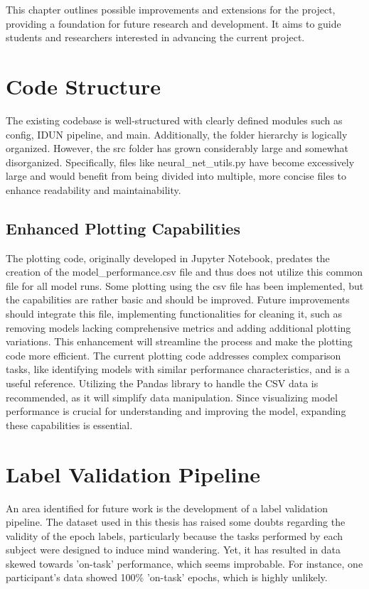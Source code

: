This chapter outlines possible improvements and extensions for the project, providing a foundation for future research and development. It aims to guide students and researchers interested in advancing the current project.

\section{Code Structure}
The existing codebase is well-structured with clearly defined modules such as config, IDUN pipeline, and main. Additionally, the folder hierarchy is logically organized. However, the src folder has grown considerably large and somewhat disorganized. Specifically, files like neural\_net\_utils.py have become excessively large and would benefit from being divided into multiple, more concise files to enhance readability and maintainability.

\subsection{Enhanced Plotting Capabilities}
The plotting code, originally developed in Jupyter Notebook, predates the creation of the model\_performance.csv file and thus does not utilize this common file for all model runs. Some plotting using the csv file has been implemented, but the capabilities are rather basic and should be improved. Future improvements should integrate this file, implementing functionalities for cleaning it, such as removing models lacking comprehensive metrics and adding additional plotting variations. This enhancement will streamline the process and make the plotting code more efficient. The current plotting code addresses complex comparison tasks, like identifying models with similar performance characteristics, and is a useful reference. Utilizing the Pandas library to handle the CSV data is recommended, as it will simplify data manipulation. Since visualizing model performance is crucial for understanding and improving the model, expanding these capabilities is essential.

\section{Label Validation Pipeline}
An area identified for future work is the development of a label validation pipeline. The dataset used in this thesis has raised some doubts regarding the validity of the epoch labels, particularly because the tasks performed by each subject were designed to induce mind wandering. Yet, it has resulted in data skewed towards 'on-task' performance, which seems improbable. For instance, one participant's data showed 100\% 'on-task' epochs, which is highly unlikely.

